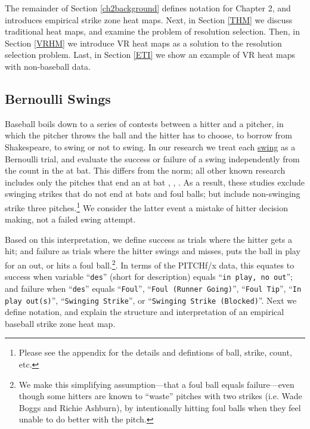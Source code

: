 The remainder of Section \ref{ch2background} defines notation for Chapter 2, and introduces empirical strike zone heat maps. Next, in Section \ref{THM} we discuss traditional heat maps, and examine the problem of resolution selection. Then, in Section \ref{VRHM} we introduce VR heat maps as a solution to the resolution selection problem. Last, in Section \ref{ETI} we show an example of VR heat maps with non-baseball data.

\subsection{Bernoulli Swings}

Baseball boils down to a series of contests between a hitter and a pitcher, in which the pitcher throws the ball and the hitter has to choose, to borrow from Shakespeare, to swing or not to swing. In our research we treat each \underline{swing} as a Bernoulli trial, and evaluate the success or failure of a swing independently from the count in the at bat. This differs from the norm; all other known research includes only the pitches that end an at bat \citep{Cross2015}, \citep{Baumer2010}, \citep{Fast2011}. As a result, these studies exclude swinging strikes that do not end at bats and foul balls; but include non-swinging strike three pitches.\footnote{Please see the appendix for the details and defintions of ball, strike, count, etc.} We consider the latter event a mistake of hitter decision making, not a failed swing attempt. 

Based on this interpretation, we define success as trials where the hitter gets a hit; and failure as trials where the hitter swings and misses, puts the ball in play for an out, or hits a foul ball.\footnote{We make this simplifying assumption---that a foul ball equals failure---even though some hitters are known to ``waste'' pitches with two strikes (i.e. Wade Boggs and Richie Ashburn), by intentionally hitting foul balls when they feel unable to do better with the pitch. }. In terms of the PITCHf/x\textsuperscript{\textregistered} data, this equates to success when variable ``\verb|des|'' (short for description)  equals ``\verb|in play, no out|''; and failure when ``\verb|des|'' equals ``\verb|Foul|'', ``\verb|Foul (Runner Going)|'', ``\verb|Foul Tip|'', ``\verb|In play out(s)|'', ``\verb|Swinging Strike|'', or ``\verb|Swinging Strike (Blocked)|''. Next we define notation, and explain the structure and interpretation of an empirical baseball strike zone heat map.

